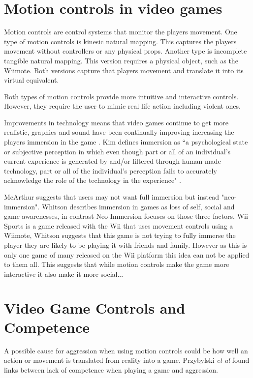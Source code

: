 \documentclass{scrartcl}
\begin{document}
\bigskip

\section{Motion controls in video games}
Motion controls are control systems that monitor the players movement. One type of motion controls is kinesic natural mapping. This captures the players movement without controllers or any physical props. Another type is incomplete tangible natural mapping. This version requires a physical object, such as the Wiimote. Both versions capture that players movement and translate it into its virtual equivalent.  \cite{McEwan2012}

Both types of motion controls provide more intuitive and interactive controls. \cite{Kim}  However, they require the user to mimic real life action including violent ones. 


\bigskip
Improvements in technology means that video games continue to get more realistic, graphics and sound have been continually improving increasing the players immersion in the game \cite{Kim}. Kim defines immersion as ``a psychological state or subjective perception in which even though part or all of an   individual’s   current   experience is generated by and/or filtered through human-made technology, part or all of the individual’s perception fails to accurately acknowledge the role of the technology in the experience" \cite{Kim}.

\bigskip
McArthur suggests that users may not want full immersion but instead "neo-immersion". \cite{McArthur} Whitson describes immersion in games as loss of  self, social and game awarenesses, in contrast Neo-Immersion focuses on those three factors. \cite{Whitson} Wii Sports is a game released with the Wii that uses movement controls using a Wiimote, Whitson suggests that this game is not trying to fully immerse the player they are likely to be playing it with friends and family. However as this is only one game of many released on the Wii platform this idea can not be applied to them all. 
This suggests that while motion controls make the game more interactive it also make it more social...
\bigskip


\section{Video Game Controls and Competence}
A possible cause for aggression when using motion controls could be how well an action or movement is translated from reality into a game.  Przybylski \textit{et al} found links between lack of competence when playing a game and aggression. \cite{przybylski}
\end{document}
